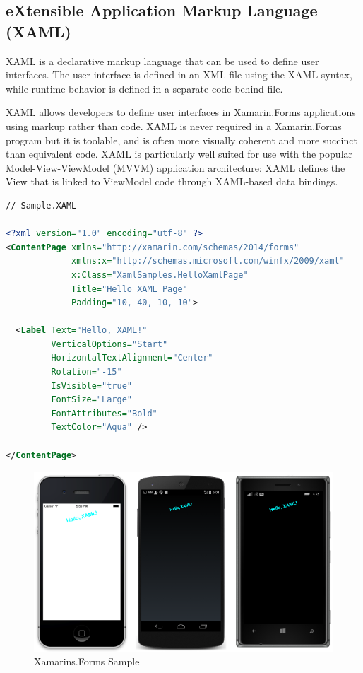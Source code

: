 \subsection{eXtensible Application Markup Language (XAML)}

XAML is a declarative markup language that can be used to define user interfaces. The user interface is defined in an XML file using the XAML syntax, while runtime behavior is defined in a separate code-behind file.

XAML allows developers to define user interfaces in Xamarin.Forms applications using markup rather than code. XAML is never required in a Xamarin.Forms program but it is toolable, and is often more visually coherent and more succinct than equivalent code. XAML is particularly well suited for use with the popular Model-View-ViewModel (MVVM) application architecture: XAML defines the View that is linked to ViewModel code through XAML-based data bindings.


\begin{lstlisting}[language=xml]
// Sample.XAML

<?xml version="1.0" encoding="utf-8" ?>
<ContentPage xmlns="http://xamarin.com/schemas/2014/forms"
             xmlns:x="http://schemas.microsoft.com/winfx/2009/xaml"
             x:Class="XamlSamples.HelloXamlPage"
             Title="Hello XAML Page"
             Padding="10, 40, 10, 10">

  <Label Text="Hello, XAML!"
         VerticalOptions="Start"
         HorizontalTextAlignment="Center"
         Rotation="-15"
         IsVisible="true"
         FontSize="Large"
         FontAttributes="Bold"
         TextColor="Aqua" />

</ContentPage>
\end{lstlisting}



\begin{figure}[th]
\centering
\includegraphics[width=\textwidth] {Figures/HelloXaml}

\caption[xamarinsformsSample]{Xamarins.Forms Sample}
\label{fig:Xamarins.Forms Sample}
\end{figure}



